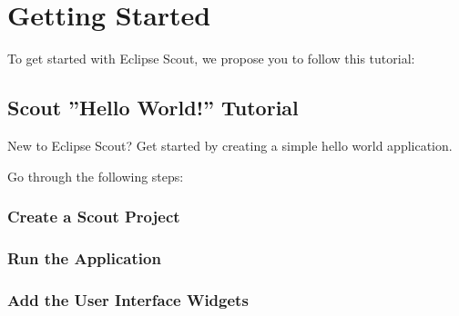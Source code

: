 \documentclass[a4paper,10pt,twoside]{book}
\begin{document}
\thispagestyle{empty}
\frontmatter




\pagestyle{plain}

\sloppy

\mainmatter


\pagestyle{headings}

\chapter*{Getting Started}

To get started with Eclipse Scout, we propose you to follow this tutorial:

\section*{Scout ''Hello World!'' Tutorial}

New to Eclipse Scout? Get started by creating a simple hello world application.

Go through the following steps:

\subsection*{Create a Scout Project}

\subsection*{Run the Application}

\subsection*{Add the User Interface Widgets}

\end{document}
